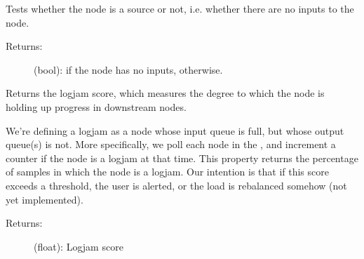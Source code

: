 \documentclass[letterpaper,10pt,english]{sphinxmanual}
\begin{document}
\begin{fulllineitems}
\begin{fulllineitems}
\begin{description}
\end{description}

\end{fulllineitems}


\begin{fulllineitems}
\label{\detokenize{api:nanostream.node.NanoNode.is_source}}
Tests whether the node is a source or not, i.e. whether there are no
inputs to the node.
\begin{description}
\item[{Returns:}] \leavevmode
(bool):  if the node has no inputs,  otherwise.

\end{description}

\end{fulllineitems}


\begin{fulllineitems}
\label{\detokenize{api:nanostream.node.NanoNode.kill_pipeline}}
\end{fulllineitems}


\begin{fulllineitems}
\label{\detokenize{api:nanostream.node.NanoNode.log_info}}
\end{fulllineitems}


\begin{fulllineitems}
\label{\detokenize{api:nanostream.node.NanoNode.logjam}}
Returns the logjam score, which measures the degree to which the
node is holding up progress in downstream nodes.

We’re defining a logjam as a
node whose input queue is full, but whose output queue(s) is not.
More specifically, we poll each node in the ,
and increment a counter if the node is a logjam at that time. This
property returns the percentage of samples in which the node is a
logjam. Our intention is that if this score exceeds a threshold,
the user is alerted, or the load is rebalanced somehow (not yet
implemented).
\begin{description}
\item[{Returns:}] \leavevmode
(float): Logjam score


\end{description}
\end{fulllineitems}
\end{fulllineitems}
\end{document}
